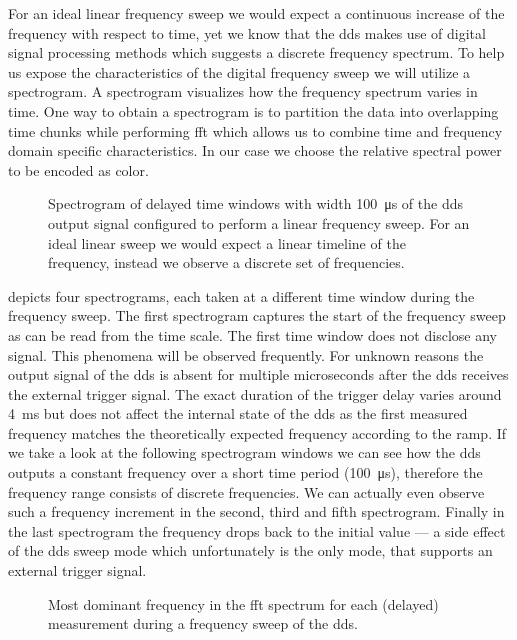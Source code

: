 For an ideal linear frequency sweep we would expect a continuous increase of
the frequency with respect to time, yet we know that the \gls{dds} makes use
of digital signal processing methods which suggests a discrete frequency
spectrum. To help us expose the characteristics of the digital frequency
sweep we will utilize a spectrogram. A spectrogram visualizes how the
frequency spectrum varies in time. One way to obtain a spectrogram is to
partition the data into overlapping time chunks while performing \gls{fft}
which allows us to combine time and frequency domain specific
characteristics. In our case we choose the relative spectral power to be
encoded as color.
\begin{figure}[htb]
  \centering
  \begin{adjustbox}{width=\textwidth}
  \end{adjustbox}
  \caption{Spectrogram of delayed time windows with width
    \SI{100}{\micro\second} of the \gls{dds} output signal configured to
    perform a linear frequency sweep. For an ideal linear sweep we would
    expect a linear timeline of the frequency, instead we observe a discrete
    set of frequencies.
  }\label{fig:signal_synthesis_spectrogram}
\end{figure}
 depicts four spectrograms, each taken
at a different time window during the frequency sweep. The first spectrogram
captures the start of the frequency sweep as can be read from the time scale.
The first time window does not disclose any signal. This phenomena will be
observed frequently. For unknown reasons the output signal of the \gls{dds} is
absent for multiple microseconds after the \gls{dds} receives the external
trigger signal. The exact duration of the trigger delay varies around
\SI{4}{\milli\second} but does not affect the internal state of the \gls{dds}
as the first measured frequency matches the theoretically expected frequency
according to the ramp. If we take a look at the following spectrogram windows
we can see how the \gls{dds} outputs a constant frequency over a short time
period (\SI{100}{\micro\second}), therefore the frequency range consists of
discrete frequencies. We can actually even observe such a
frequency increment in the second, third and fifth spectrogram. Finally in the
last spectrogram the frequency drops back to the initial value --- a side
effect of the \gls{dds} sweep mode which unfortunately is the only mode, that
supports an external trigger signal.
\begin{figure}[htb]
  \centering
  \begin{adjustbox}{width=\textwidth}
  \end{adjustbox}
  \caption{Most dominant frequency in the \gls{fft} spectrum for each
    (delayed) measurement during a frequency sweep of the \gls{dds}.
  }\label{fig:signal_synthesis_frequency}
\end{figure}
